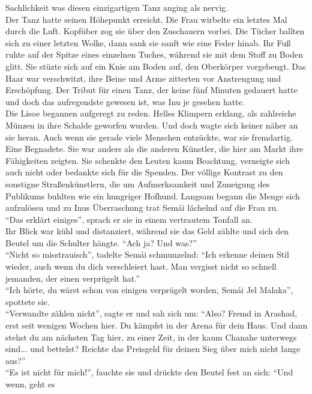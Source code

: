 Sachlichkeit was diesen einzigartigen Tanz anging als nervig.\\
Der Tanz hatte seinen Höhepunkt erreicht. Die Frau wirbelte ein letztes Mal durch die Luft. 
Kopfüber zog sie über den Zuschauern vorbei. Die Tücher ballten sich zu einer letzten Wolke, dann 
sank sie sanft wie eine Feder hinab. Ihr Fuß ruhte auf der Spitze eines einzelnen Tuches, während 
sie mit dem Stoff zu Boden glitt. Sie stüzte sich auf ein Knie am Boden auf, den Oberkörper 
vorgebeugt. Das Haar war verschwitzt, ihre Beine und Arme zitterten vor Anstrengung und 
Erschöpfung. Der Tribut für einen Tanz, der keine fünf Minuten gedauert hatte und doch das 
aufregendste gewesen ist, was Inu je gesehen hatte.\\
Die Lisoe begannen aufgeregt zu reden. Helles Klimpern erklang, als zahlreiche Münzen in ihre 
Schalde geworfen wurden. Und doch wagte sich keiner näher an sie heran. Auch wenn sie gerade viele 
Menschen entzückte, war sie fremdartig. Eine Begnadete. Sie war anders als die anderen Künstler, 
die hier am Markt ihre Fähigkeiten zeigten. Sie schenkte den Leuten kaum Beachtung, verneigte sich 
auch nicht oder bedankte sich für die Spenden. Der völlige Kontrast zu den sonstigne 
Straßenkünstlern, die um Aufmerksamkeit und Zuneigung des Publikums buhlten wie ein hungriger 
Hofhund. Langsam begann die Menge sich aufzulösen und zu Inus Überraschung trat Semái lächelnd auf 
die Frau zu.\\
``Das erklärt einiges'', sprach er sie in einem vertrautem Tonfall an. \\
Ihr Blick war kühl und distanziert, während sie das Geld zählte und sich den Beutel um die Schulter 
hängte. ``Ach ja? Und was?''\\
``Nicht so misstrauisch'', tadelte Semái schmunzelnd: ``Ich erkenne deinen Stil wieder, auch wenn 
du dich verschleiert hast. Man vergisst nicht so schnell jemanden, der einen verprügelt hat.''\\
``Ich hörte, du wärst schon von einigen verprügelt worden, Semái Jel Malaka'', spottete sie. \\
``Verwandte zählen nicht'', sagte er und sah sich um: ``Also? Fremd in Arashad, erst seit wenigen 
Wochen hier. Du kämpfst in der Arena für dein Haus. Und dann stehst du am nächsten Tag hier, zu 
einer Zeit, in der kaum Chanahe unterwegs sind... und bettelst? Reichte das Preisgeld für deinen 
Sieg über mich nicht lange aus?''\\
``Es ist nicht für mich!'', fauchte sie und drückte den Beutel fest an sich: ``Und wenn, geht es 
